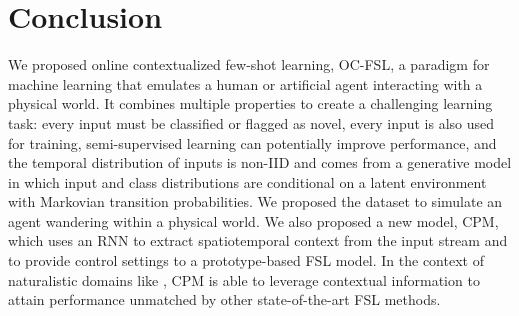 \vspace{-0.1in}
\section{Conclusion}
\vspace{-0.1in}
We proposed online contextualized few-shot learning, OC-FSL, a paradigm for machine learning that
emulates a human or artificial agent interacting with a physical world. It combines multiple
properties to create a challenging learning task: every input must be classified or flagged as
novel, every input is also used for training, semi-supervised learning can potentially improve
performance, and the temporal distribution of inputs is non-IID and comes from a generative model in
which  input and class distributions are conditional on a latent environment with Markovian
transition probabilities. We proposed the \ourroom{} dataset to simulate an agent wandering within a
physical world. We also proposed a new model, CPM, which uses an RNN to extract spatiotemporal
context from the input stream and to provide control settings to a prototype-based FSL model. In the
context of naturalistic domains like \ourroom{}, CPM is able to leverage contextual information to
attain performance unmatched by other state-of-the-art FSL methods.